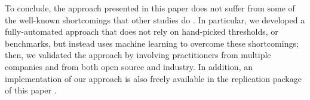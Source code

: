 
To conclude, the approach presented in this paper does not suffer from some of the well-known shortcomings that other studies do \cite{Khomyakov2020}.
In particular, we developed a fully-automated approach that does not rely on hand-picked thresholds, or benchmarks, but instead uses machine learning to overcome these shortcomings; then, we validated the approach by involving practitioners from multiple companies and from both open source and industry.
In addition, an implementation of our approach is also freely available in the replication package of this paper \cite{ReplicationPackageC6}.

